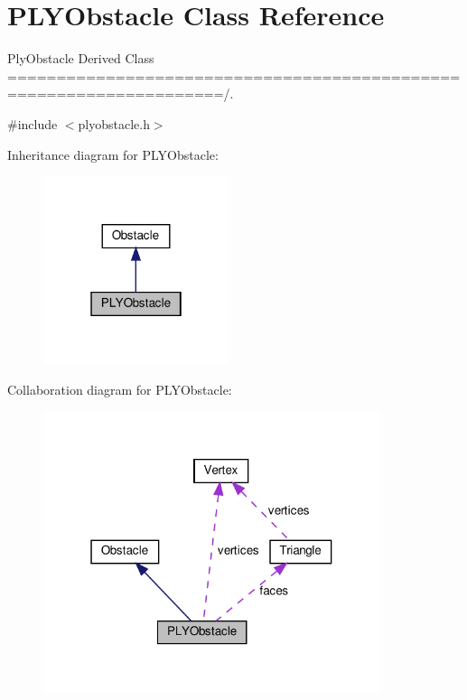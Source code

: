 \hypertarget{class_p_l_y_obstacle}{}\section{P\+L\+Y\+Obstacle Class Reference}
\label{class_p_l_y_obstacle}


Ply\+Obstacle Derived Class ====================================================================/.  




{\ttfamily \#include $<$plyobstacle.\+h$>$}



Inheritance diagram for P\+L\+Y\+Obstacle\+:
\nopagebreak
\begin{figure}[H]
\begin{center}
\leavevmode
\includegraphics[width=154pt]{class_p_l_y_obstacle__inherit__graph}
\end{center}
\end{figure}


Collaboration diagram for P\+L\+Y\+Obstacle\+:
\nopagebreak
\begin{figure}[H]
\begin{center}
\leavevmode
\includegraphics[width=280pt]{class_p_l_y_obstacle__coll__graph}
\end{center}
\end{figure}
